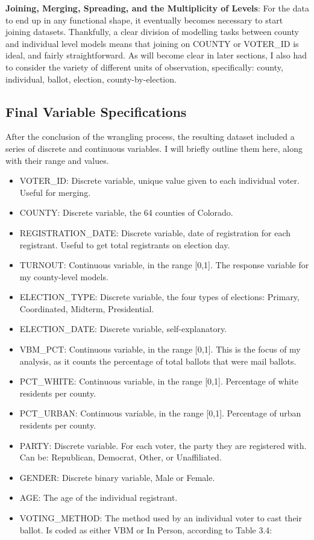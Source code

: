 \documentclass[12pt,twoside]{reedthesis}
\providecommand{\tightlist}{%
  \setlength{\itemsep}{0pt}\setlength{\parskip}{0pt}}
\begin{document}
  \textbf{Joining, Merging, Spreading, and the Multiplicity of Levels}:
  For the data to end up in any functional shape, it eventually becomes
  necessary to start joining datasets. Thankfully, a clear division of
  modelling tasks between county and individual level models means that
  joining on COUNTY or VOTER\_ID is ideal, and fairly straightforward. As
  will become clear in later sections, I also had to consider the variety
  of different units of observation, specifically: county, individual,
  ballot, election, county-by-election.
  
  \subsection{Final Variable
  Specifications}\label{final-variable-specifications}
  
  After the conclusion of the wrangling process, the resulting dataset
  included a series of discrete and continuous variables. I will briefly
  outline them here, along with their range and values.
  
  \begin{itemize}
  \tightlist
  \item
    VOTER\_ID: Discrete variable, unique value given to each individual
    voter. Useful for merging.
  \item
    COUNTY: Discrete variable, the 64 counties of Colorado.
  \item
    REGISTRATION\_DATE: Discrete variable, date of registration for each
    registrant. Useful to get total registrants on election day.
  \item
    TURNOUT: Continuous variable, in the range {[}0,1{]}. The response
    variable for my county-level models.
  \item
    ELECTION\_TYPE: Discrete variable, the four types of elections:
    Primary, Coordinated, Midterm, Presidential.
  \item
    ELECTION\_DATE: Discrete variable, self-explanatory.
  \item
    VBM\_PCT: Continuous variable, in the range {[}0,1{]}. This is the
    focus of my analysis, as it counts the percentage of total ballots
    that were mail ballots.
  \item
    PCT\_WHITE: Continuous variable, in the range {[}0,1{]}. Percentage of
    white residents per county.
  \item
    PCT\_URBAN: Continuous variable, in the range {[}0,1{]}. Percentage of
    urban residents per county.
  \item
    PARTY: Discrete variable. For each voter, the party they are
    registered with. Can be: Republican, Democrat, Other, or Unaffiliated.
  \item
    GENDER: Discrete binary variable, Male or Female.
  \item
    AGE: The age of the individual registrant.
  \item
    VOTING\_METHOD: The method used by an individual voter to cast their
    ballot. Is coded as either VBM or In Person, according to Table 3.4:
  \end{itemize}
  
\end{document}
